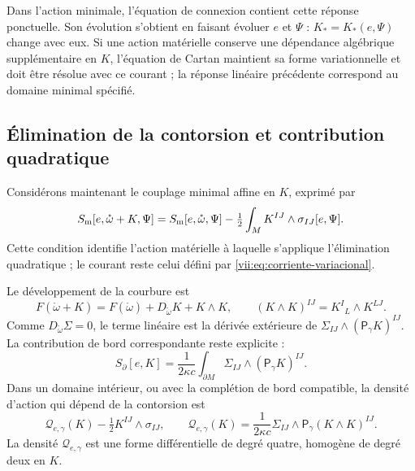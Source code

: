 Dans l'action minimale, l'équation de connexion contient cette réponse
ponctuelle. Son évolution s'obtient en faisant évoluer \(e\) et \(\Psi\) :
\(K_*=K_*(e,\Psi)\) change avec eux. Si une action matérielle conserve
une dépendance algébrique supplémentaire en \(K\), l'équation de Cartan
maintient sa forme variationnelle et doit être résolue avec ce courant ;
la réponse linéaire précédente correspond au domaine minimal spécifié.

\subsection{Élimination de la contorsion et contribution quadratique}
\label{vii:subsec:respuesta-cuadratica}

Considérons maintenant le couplage minimal affine en \(K\), exprimé par
\begin{equation}
 S_{\rm m}[e,\mathring\omega+K,\Psi]
 =S_{\rm m}[e,\mathring\omega,\Psi]
   -\tfrac12\int_M K^{IJ}\wedge\sigma_{IJ}[e,\Psi].
 \label{vii:eq:materia-afin-contorsion}
\end{equation}
Cette condition identifie l'action matérielle à laquelle s'applique
l'élimination quadratique ; le courant reste celui défini par
\eqref{vii:eq:corriente-variacional}.

Le développement de la courbure est
\begin{equation}
 F(\mathring\omega+K)
 =F(\mathring\omega)+D_{\mathring\omega}K+K\wedge K,
 \qquad (K\wedge K)^{IJ}=K^I{}_{L}\wedge K^{LJ}.
 \label{vii:eq:curvatura-contorsion}
\end{equation}
Comme \(D_{\mathring\omega}\Sigma=0\), le terme linéaire est la
dérivée extérieure de \(\Sigma_{IJ}\wedge(\mathsf P_\gamma K)^{IJ}\).
La contribution de bord correspondante reste explicite :
\begin{equation}
 S_\partial[e,K]=\frac1{2\kappa c}
     \int_{\partial M}\Sigma_{IJ}\wedge(\mathsf P_\gamma K)^{IJ}.
 \label{vii:eq:borde-contorsion}
\end{equation}
Dans un domaine intérieur, ou avec la complétion de bord compatible,
la densité d'action qui dépend de la contorsion est
\begin{equation}
 \mathcal Q_{e,\gamma}(K)-\tfrac12K^{IJ}\wedge\sigma_{IJ},
 \qquad
 \mathcal Q_{e,\gamma}(K)
  =\frac1{2\kappa c}\Sigma_{IJ}\wedge
                         \mathsf P_\gamma(K\wedge K)^{IJ}.
 \label{vii:eq:forma-cuadratica-contorsion}
\end{equation}
La densité \(\mathcal Q_{e,\gamma}\) est une forme différentielle de
degré quatre, homogène de degré deux en \(K\).


